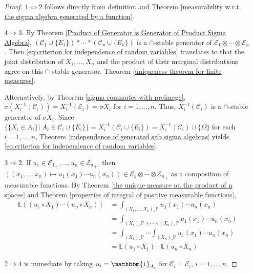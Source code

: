 \documentclass[11pt, a4paper, openany]{book}
\theoremstyle{definition}
\begin{document}
    \begin{proof}
        $1\Leftrightarrow 2$ follows directly from definition and Theorem \ref{measurability w.r.t. the sigma algebra generated by a function}.

        $4\Rightarrow 3$. By Theorem \ref{Product of Generator is Generator of Product Sigma Algebra}, $(\mathscr{C}_1\cup\{E_1\})*\cdots *(\mathscr{C}_n\cup\{E_n\})$ is a $\cap$-stable generator of $\mathscr{E}_1\otimes\cdots\otimes\mathscr{E}_n$. Then \eqref{eq:criterion for independence of random variables} translates to that the joint distribution of $X_1,\dots,X_n$ and the product of their marginal distributions agree on this $\cap$-stable generator. Theorem \ref{uniqueness theorem for finite measures}.

        Alternatively, by Theorem \ref{sigma commutes with preimage}, $\sigma(X_i^{-1}(\mathscr{C}_i))=X_i^{-1}(\mathscr{E}_i)=\sigma X_i$ for $i=1,\dots,n$. Thus, $X_i^{-1}(\mathscr{C}_i)$ is a $\cap$-stable generator of $\sigma X_i$. Since $\{\{X_i\in A_i\}\,|\, A_i\in\mathscr{C}_i\cup\{E_i\}\}=X_i^{-1}(\mathscr{C}_i\cup\{E_i\})=X_i^{-1}(\mathscr{C}_i)\cup\{\Omega\}$ for each $i=1,\dots,n$, Theorem \ref{independence of generated sub sigma algebras} yields \eqref{eq:criterion for independence of random variables}.

        $3\Rightarrow 2$. If $u_1\in \overline{\mathscr{E}_1}_+,\dots,u_n\in\overline{\mathscr{E}_n}_+$, then $((x_1,\dots,x_n)\mapsto u_1(x_1)\cdots u_n(x_n))\in \overline{\mathscr{E}_1\otimes\cdots\otimes\mathscr{E}_n}_+$ as a composition of measurable functions. By Theorem \ref{the unique measure on the product of n spaces} and Theorem \ref{properties of integral of positive measurable functions},
        \begin{align*}
            \mathbb{E}((u_1\circ X_1)\cdots (u_n\circ X_n))&=\int_{(X_1,\dots,X_n)_*\mathbb{P}}u_1(x_1)\cdots u_n(x_n)\\
            &=\int_{(X_1)_*\mathbb{P}\,\times\cdots \times(X_n)_*\mathbb{P}}u_1(x_1)\cdots u_n(x_n)\\
            &=\int_{(X_1)_*\mathbb{P}}\cdots \int_{(X_n)_*\mathbb{P}}u_1(x_1)\cdots u_n(x_n)\\
            &=\mathbb{E}(u_1\circ X_1)\cdots\mathbb{E}(u_n\circ X_n)
        \end{align*}

        $2\Rightarrow 4$ is immediate by taking $u_i=\mathbbm{1}_{A_i}$ for $\mathscr{C}_i=\mathscr{E}_i$, $i=1,\dots,n$.
    \end{proof}
\end{document}
